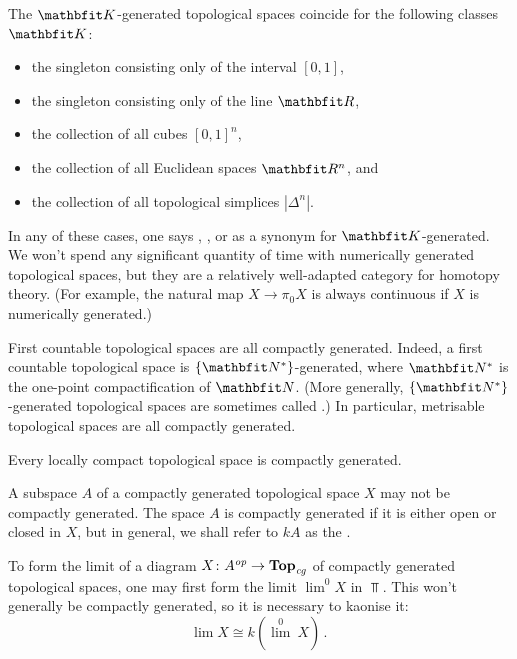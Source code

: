 \begin{exm}
	The $ \KK $-generated topological spaces coincide for the following classes $ \KK $:
	\begin{itemize}
		\item the singleton consisting only of the interval $ [0,1] $,
		\item the singleton consisting only of the line $ \RR $,
		\item the collection of all cubes $ [0, 1]^n $,
		\item the collection of all Euclidean spaces $ \RR^n $, and
		\item the collection of all topological simplices $ |\Delta^n| $.
	\end{itemize}
	In any of these cases, one says , , or  as a synonym for $ \KK $-generated.
	We won't spend any significant quantity of time with numerically generated topological spaces, but they are a relatively well-adapted category for homotopy theory.
	(For example, the natural map $ X \to \pi_0 X $ is always continuous if $ X $ is numerically generated.)
\end{exm}

\begin{exm}
	First countable topological spaces are all compactly generated.
	Indeed, a first countable topological space is $ \{ \NN^{\ast} \} $-generated, where $ \NN^{\ast} $ is the one-point compactification of $ \NN $.
	(More generally, $\{ \NN^{\ast} \}$-generated topological spaces are sometimes called .)
	In particular, metrisable topological spaces are all compactly generated.
\end{exm}

\begin{exm}
	Every locally compact topological space is compactly generated.
\end{exm}

\begin{wrn}
	A subspace $ A $ of a compactly generated topological space $ X $ may not be compactly generated.
	The space $ A $ is compactly generated if it is either open or closed in $ X $, but in general, we shall refer to $ kA $ as the .
\end{wrn}

\begin{cnstr}
	To form the limit of a diagram $ X \colon A^{\textit{op}} \to \textbf{\textup{Top}}_{\textit{cg}} $ of compactly generated topological spaces, one may first form the limit $ \lim^0 X $ in $ \Top $.
	This won't generally be compactly generated, so it is necessary to kaonise it:
	\[
		\lim X \cong k({\lim}^0\ X) \period
	\]
\end{cnstr}

